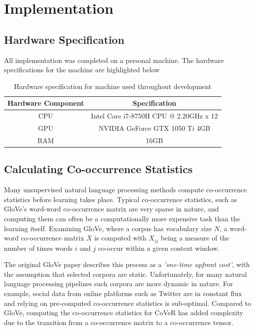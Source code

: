 \chapter{Implementation}
\label{chap:implementation}
\section{Hardware Specification}
All implementation was completed on a personal machine. The hardware specifications for the machine are highlighted below

\begin{table}[h!]
	\centering
	\begin{tabular}{||c | c||} 
		\hline
		Hardware Component & Specification \\ [0.5ex] 
		\hline\hline
		CPU & Intel Core i7-8750H CPU @ 2.20GHz x 12 \\ 
		GPU & NVIDIA GeForce GTX 1050 Ti 4GB \\
		RAM & 16GB \\
		\hline
	\end{tabular}
	\caption{Hardware specification for machine used throughout development}
	\label{table:1}
\end{table}
\section{Calculating Co-occurrence Statistics}
Many unsupervised natural language processing methods compute co-occurrence statistics before learning takes place. Typical co-occurrence statistics, such as GloVe's word-word co-occurrence matrix are very sparse in nature, and computing them can often be a computationally more expensive task than the learning itself. Examining GloVe, where a corpus has vocabulary size \(N\), a word-word co-occurrence matrix \(X\) is computed with \(X_{ij}\) being a measure of the number of times words \(i\) and \(j\) co-occur within a given context window. 

\noindent
\newline
The original GloVe paper describes this process as a \textit{'one-time upfront cost'}, with the assumption that selected corpora are static. Unfortunately, for many natural language processing pipelines such corpora are more dynamic in nature. For example, social data from online platforms such as Twitter are in constant flux and relying on pre-computed co-occurrence statistics is sub-optimal. Compared to GloVe, computing the co-occurrence statistics for CoVeR has added complexity due to the transition from a co-occurrence matrix to a co-occurrence tensor. 

